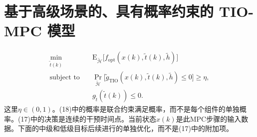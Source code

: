 \documentclass{article}
\begin{document}
\section*{基于高级场景的、具有概率约束的 TIO-MPC 模型}
\begin{align}
\min_{\tilde t(k)}\quad &\mathrm E_{\tilde{\mathcal H}}\bigl[f_{\mathrm{opt}}(x(k),\tilde t(k),\tilde h)\bigr] \tag{17}\\
\text{subject to}\quad &\Pr_{\tilde{\mathcal H}}\bigl[\tilde g_{\mathrm{TIO}}(x(k),\tilde t(k),\tilde h)\leq0\bigr]\geq\eta, \tag{18}\\
&g_{\tilde t}(\tilde t(k))\leq0. \tag{19}
\end{align}
这里$\eta\in(0,1)$。(18)中的概率是联合约束满足概率，而不是每个组件的单独概率。(17)中的决策是连续的干预时间点。当前状态$x(k)$是此MPC步骤的输入数据。下面的中级和低级目标后续进行的单独优化，而不是(17)中的附加项。
\end{document}
